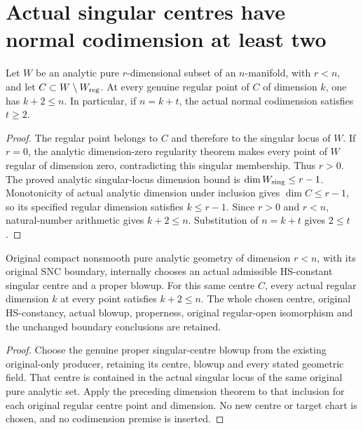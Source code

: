 \section{Actual singular centres have normal codimension at least two}
\label{sec:hironaka-actual-singular-centre-codimension}

\begin{theorem}
\label{hir:actual-singular-centre-normal-codimension-two}
\leanok
Let $W$ be an analytic pure $r$-dimensional subset of an $n$-manifold, with $r<n$, and let $C\subset W\setminus W_{\rm reg}$.
At every genuine regular point of $C$ of dimension $k$, one has $k+2\le n$.
In particular, if $n=k+t$, the actual normal codimension satisfies $t\ge2$.
\end{theorem}
\begin{proof}
The regular point belongs to $C$ and therefore to the singular locus of $W$.
If $r=0$, the analytic dimension-zero regularity theorem makes every point of $W$ regular of dimension zero, contradicting this singular membership. Thus $r>0$.
The proved analytic singular-locus dimension bound is $\dim W_{\rm sing}\le r-1$.
Monotonicity of actual analytic dimension under inclusion gives $\dim C\le r-1$, so its specified regular dimension satisfies $k\le r-1$.
Since $r>0$ and $r<n$, natural-number arithmetic gives $k+2\le n$.
Substitution of $n=k+t$ gives $2\le t$.
\end{proof}

\begin{theorem}
\label{hir:actual-original-chosen-singular-centre-codimension-two}
\leanok
Original compact nonsmooth pure analytic geometry of dimension $r<n$, with its original SNC boundary, internally chooses an actual admissible HS-constant singular centre and a proper blowup.
For this same centre $C$, every actual regular dimension $k$ at every point satisfies $k+2\le n$.
The whole chosen centre, original HS-constancy, actual blowup, properness, original regular-open isomorphism and the unchanged boundary conclusions are retained.
\end{theorem}
\begin{proof}
Choose the genuine proper singular-centre blowup from the existing original-only producer, retaining its centre, blowup and every stated geometric field.
That centre is contained in the actual singular locus of the same original pure analytic set.
Apply the preceding dimension theorem to that inclusion for each original regular centre point and dimension.
No new centre or target chart is chosen, and no codimension premise is inserted.
\end{proof}
